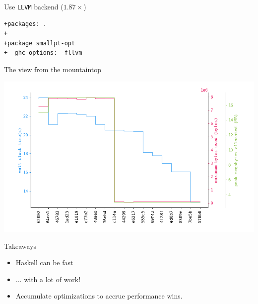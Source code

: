\documentclass[8pt]{beamer}
\begin{document}
\begin{frame}[fragile]{Use \texttt{LLVM} backend ($1.87\times$)}
\begin{verbatim}
+packages: .
+
+package smallpt-opt
+  ghc-options: -fllvm
\end{verbatim}
\end{frame}



\begin{frame}[fragile]{The view from the mountaintop}

\includegraphics[height=0.6\textwidth]{./perfdata-gen.png}

\end{frame}


\begin{frame}[fragile]{Takeaways}
\pause
\begin{itemize}
\item Haskell can be fast \pause
\item ... with a lot of work! \pause
\item Accumulate optimizations to accrue performance wins. \pause
\end{itemize}
\end{frame}
\end{document}
